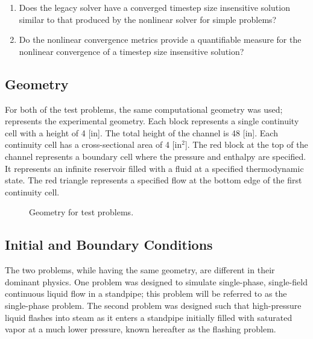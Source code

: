 \begin{enumerate}
\item{Does the legacy solver have a converged timestep size insensitive solution similar to that produced by the nonlinear solver for simple problems?}
\item{Do the nonlinear convergence metrics provide a quantifiable measure for the nonlinear convergence of a timestep size insensitive solution?}
\end{enumerate}

\subsection{Geometry}
\label{subsect:experimental_geometry}
For both of the test problems, the same computational geometry was used;   represents the experimental geometry.
Each block represents a single continuity cell with a height of 4 [in].
The total height of the channel is 48 [in].
Each continuity cell has a cross-sectional area of 4 [in$^2$].
The red block at the top of the channel represents a boundary cell where the pressure and enthalpy are specified.
It represents an infinite reservoir filled with a fluid at a specified thermodynamic state.
The red triangle represents a specified flow at the bottom edge of the first continuity cell. 

\begin{figure}[h!t]
\begin{center}
\end{center}
\caption{Geometry for test problems.}
\label{fig:exp_geometry}
\end{figure}

\subsection{Initial and Boundary Conditions}
\label{subsect:ic_bc}

The two problems, while having the same geometry, are different in their dominant physics.
One problem was designed to simulate single-phase, single-field continuous liquid flow in a standpipe; this problem will be referred to as the single-phase problem.
The second problem was designed such that high-pressure liquid flashes into steam as it enters a standpipe initially filled with saturated vapor at a much lower pressure, known hereafter as the flashing problem.

